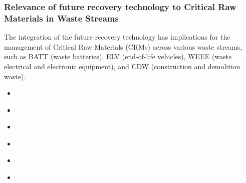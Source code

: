 








\subsubsection{Relevance of future recovery technology to Critical Raw Materials in Waste Streams}

The integration of the future recovery technology has implications for the management of Critical Raw Materials
(CRMs) across various waste streams, such as BATT (waste batteries), ELV
(end-of-life vehicles), WEEE (waste electrical and electronic equipment), and
CDW (construction and demolition waste).

\wasteSubsubsecBATT
\begin{itemize}
    \item
\end{itemize}

\wasteSubsubsecELV
\begin{itemize}
    \item
\end{itemize}

\wasteSubsubsecWEEE
\begin{itemize}
    \item
\end{itemize}

\wasteSubsubsecCDW
\begin{itemize}
    \item
\end{itemize}

\wasteSubsubsecMIN
\begin{itemize}
    \item
\end{itemize}

\wasteSubsubsecSLASH
\begin{itemize}
    \item
\end{itemize}
\sectionEndlines
\clearpage
